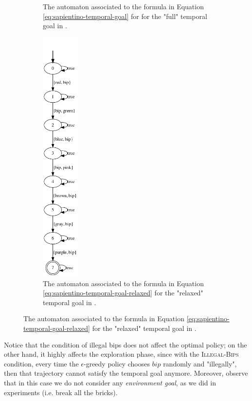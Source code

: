 \begin{figure}[h]
\begin{subfigure}{0.5\textwidth}
		\caption{The automaton associated to the \LDLf formula in Equation \ref{eq:sapientino-temporal-goal} for for the "full" temporal goal in \Sapientino.}
		\label{fig:sapientino-automaton}
	\end{subfigure}
	\begin{subfigure}{0.5\textwidth}
		\centering
		\includegraphics[width=0.21\textwidth]{images/sapientino_ldlf_relaxed.png}
		\caption{The automaton associated to the \LDLf formula in Equation \ref{eq:sapientino-temporal-goal-relaxed} for the "relaxed" temporal goal in \Sapientino.}
		\label{fig:sapientino-relaxed-automaton}
	\end{subfigure}

\end{figure}

Notice that the condition of illegal bips does not affect the optimal policy; on the other hand, it highly affects the exploration phase, since with the \textsc{Illegal-Bips} condition, every time the $\epsilon$-greedy policy chooses $bip$ randomly and "illegally", then that trajectory cannot satisfy the temporal goal anymore.  Moreover, observe that in this case we do not consider any \emph{environment goal}, as we did in \Breakout experiments (i.e. break all the bricks).
